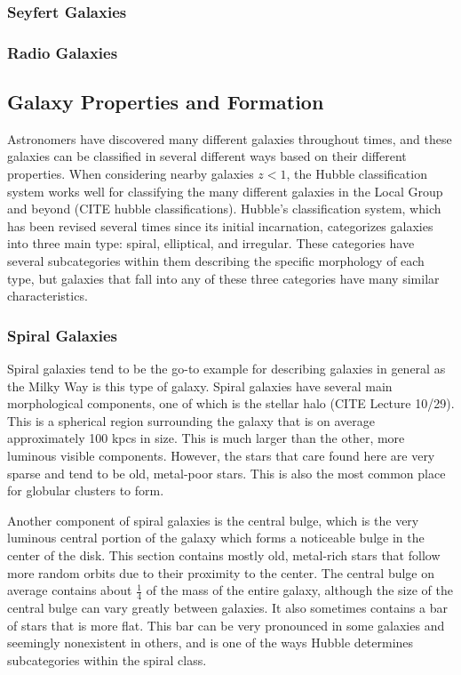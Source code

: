 \documentclass[12pt]{article}
\begin{document}
    \subsubsection*{Seyfert Galaxies}

    \subsubsection*{Radio Galaxies}

\subsection*{\bf Galaxy Properties and Formation}
Astronomers have discovered many different galaxies throughout times, and these
galaxies can be classified in several different ways based on their different
properties.  When considering nearby galaxies $z < 1$, the Hubble
classification system works well for classifying the many different galaxies in
the Local Group and beyond (CITE hubble classifications).  Hubble's
classification system, which has been revised several times since its initial
incarnation, categorizes galaxies into three main type: spiral, elliptical, and
irregular.  These categories have several subcategories within them describing
the specific morphology of each type, but galaxies that fall into any of these
three categories have many similar characteristics.

    \subsubsection*{Spiral Galaxies}
    Spiral galaxies tend to be the go-to example for describing galaxies in general
    as the Milky Way is this type of galaxy.  Spiral galaxies have several main
    morphological components, one of which is the stellar halo (CITE Lecture 10/29).
    This is a spherical region surrounding the galaxy that is on average
    approximately 100 kpcs in size.  This is much larger than the other, more
    luminous visible components.  However, the stars that care found here are very
    sparse and tend to be old, metal-poor stars.  This is also the most common place
    for globular clusters to form.

    Another component of spiral galaxies is the central bulge, which is the very
    luminous central portion of the galaxy which forms a noticeable bulge in the
    center of the disk.  This section contains mostly old, metal-rich stars that
    follow more random orbits due to their proximity to the center.  The central
    bulge on average contains about $\frac{1}{4}$ of the mass of the entire
    galaxy, although the size of the central bulge can vary greatly between
    galaxies.  It also sometimes contains a bar of stars that is more flat.
    This bar can be very pronounced in some galaxies and seemingly nonexistent
    in others, and is one of the ways Hubble determines subcategories within the
    spiral class.
\end{document}
